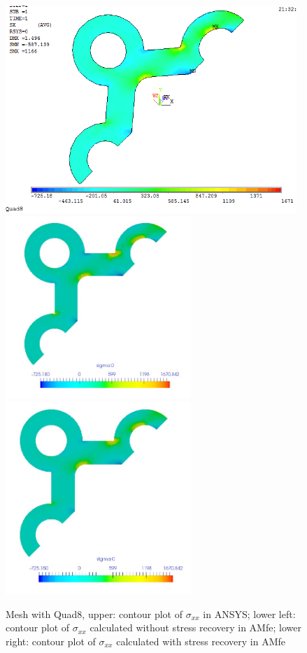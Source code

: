 \begin{figure}[htbp]
	\begin{center}
		\includegraphics[width=11cm,clip]{Quad8_Sxx.png} 
		\includegraphics[width=7cm,clip]{Quad8_Sxx_PD.png} 			
		\includegraphics[width=7cm,clip]{Quad8_Sxx_P.png} 		
		\caption{Mesh with Quad8, upper: contour plot of $\sigma_{xx}$ in ANSYS; lower left: contour plot of $\sigma_{xx}$ calculated without stress recovery in AMfe; lower right: contour plot of $\sigma_{xx}$ calculated with stress recovery in AMfe} \label{fig: Quad8_Sxx}
	\end{center}
\end{figure}
\clearpage 

